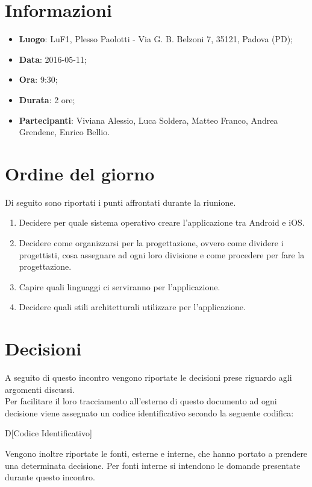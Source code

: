 \documentclass[a4paper,titlepage]{article}
\begin{document}
\maketitle

\begin{diario}
\end{diario}

\newpage
\tableofcontents

\newpage
\section{Informazioni}
\label{sec:Informazioni}

\begin{itemize}
 \item \textbf{Luogo}: LuF1, Plesso Paolotti - Via G. B. Belzoni 7, 35121, Padova (PD);
 \item \textbf{Data}: 2016-05-11;
 \item \textbf{Ora}: 9:30;
 \item \textbf{Durata}: 2 ore;
 \item \textbf{Partecipanti}: Viviana Alessio, Luca Soldera, Matteo Franco, Andrea Grendene, Enrico Bellio.
\end{itemize}

\section{Ordine del giorno}
\label{sec:Ordine del giorno}
Di seguito sono riportati i punti affrontati durante la riunione.

\begin{enumerate}
	\item Decidere per quale sistema operativo creare l'applicazione tra Android e iOS.
	\item Decidere come organizzarsi per la progettazione, ovvero come dividere i progettisti, cosa assegnare ad ogni loro divisione e come procedere per fare la progettazione.
	\item Capire quali linguaggi ci serviranno per l'applicazione.
	\item Decidere quali stili architetturali utilizzare per l'applicazione.
\end{enumerate}

\section{Decisioni}
A seguito di questo incontro vengono riportate le decisioni prese riguardo agli argomenti discussi. \\
Per facilitare il loro tracciamento all'esterno di questo documento ad ogni decisione viene assegnato un codice identificativo secondo la seguente codifica:
\begin{center}
D[Codice Identificativo]
\end{center}
Vengono inoltre riportate le fonti, esterne e interne, che hanno portato a prendere una determinata decisione. Per fonti interne si intendono le domande presentate durante questo incontro.
\end{document}
